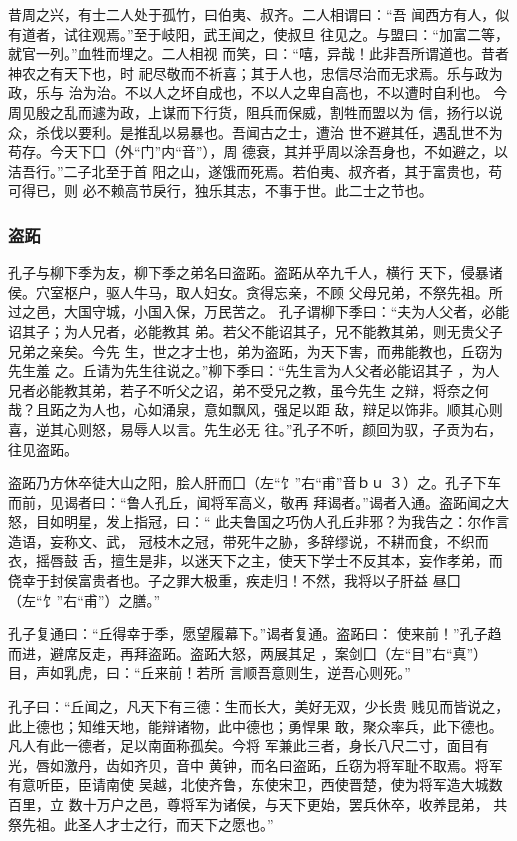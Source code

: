 \documentclass[]{article}
\begin{document}
昔周之兴，有士二人处于孤竹，曰伯夷、叔齐。二人相谓曰：``吾
闻西方有人，似有道者，试往观焉。''至于岐阳，武王闻之，使叔旦
往见之。与盟曰：``加富二等，就官一列。''血牲而埋之。二人相视
而笑，曰：``嘻，异哉！此非吾所谓道也。昔者神农之有天下也，时
祀尽敬而不祈喜；其于人也，忠信尽治而无求焉。乐与政为政，乐与
治为治。不以人之坏自成也，不以人之卑自高也，不以遭时自利也。
今周见殷之乱而遽为政，上谋而下行货，阻兵而保威，割牲而盟以为
信，扬行以说众，杀伐以要利。是推乱以易暴也。吾闻古之士，遭治
世不避其任，遇乱世不为苟存。今天下囗（外``门''内``音''），周
德衰，其并乎周以涂吾身也，不如避之，以洁吾行。''二子北至于首
阳之山，遂饿而死焉。若伯夷、叔齐者，其于富贵也，苟可得已，则
必不赖高节戾行，独乐其志，不事于世。此二士之节也。

\hypertarget{header-n2378}{%
\subsubsection{盗跖}\label{header-n2378}}

孔子与柳下季为友，柳下季之弟名曰盗跖。盗跖从卒九千人，横行
天下，侵暴诸侯。穴室枢户，驱人牛马，取人妇女。贪得忘亲，不顾
父母兄弟，不祭先祖。所过之邑，大国守城，小国入保，万民苦之。
孔子谓柳下季曰：``夫为人父者，必能诏其子；为人兄者，必能教其
弟。若父不能诏其子，兄不能教其弟，则无贵父子兄弟之亲矣。今先
生，世之才士也，弟为盗跖，为天下害，而弗能教也，丘窃为先生羞
之。丘请为先生往说之。''柳下季曰：``先生言为人父者必能诏其子
，为人兄者必能教其弟，若子不听父之诏，弟不受兄之教，虽今先生
之辩，将奈之何哉？且跖之为人也，心如涌泉，意如飘风，强足以距
敌，辩足以饰非。顺其心则喜，逆其心则怒，易辱人以言。先生必无
往。''孔子不听，颜回为驭，子贡为右，往见盗跖。

盗跖乃方休卒徒大山之阳，脍人肝而囗（左``饣''右``甫''音ｂｕ
３）之。孔子下车而前，见谒者曰：``鲁人孔丘，闻将军高义，敬再
拜谒者。''谒者入通。盗跖闻之大怒，目如明星，发上指冠，曰：``
此夫鲁国之巧伪人孔丘非邪？为我告之：尔作言造语，妄称文、武，
冠枝木之冠，带死牛之胁，多辞缪说，不耕而食，不织而衣，摇唇鼓
舌，擅生是非，以迷天下之主，使天下学士不反其本，妄作孝弟，而
侥幸于封侯富贵者也。子之罪大极重，疾走归！不然，我将以子肝益
昼囗（左``饣''右``甫''）之膳。''

孔子复通曰：``丘得幸于季，愿望履幕下。''谒者复通。盗跖曰：
使来前！''孔子趋而进，避席反走，再拜盗跖。盗跖大怒，两展其足
，案剑囗（左``目''右``真''）目，声如乳虎，曰：``丘来前！若所
言顺吾意则生，逆吾心则死。''

孔子曰：``丘闻之，凡天下有三德：生而长大，美好无双，少长贵
贱见而皆说之，此上德也；知维天地，能辩诸物，此中德也；勇悍果
敢，聚众率兵，此下德也。凡人有此一德者，足以南面称孤矣。今将
军兼此三者，身长八尺二寸，面目有光，唇如激丹，齿如齐贝，音中
黄钟，而名曰盗跖，丘窃为将军耻不取焉。将军有意听臣，臣请南使
吴越，北使齐鲁，东使宋卫，西使晋楚，使为将军造大城数百里，立
数十万户之邑，尊将军为诸侯，与天下更始，罢兵休卒，收养昆弟，
共祭先祖。此圣人才士之行，而天下之愿也。''
\end{document}
